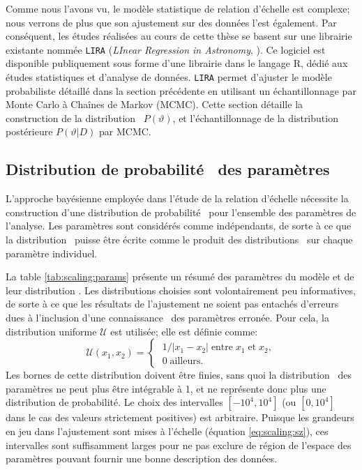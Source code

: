Comme nous l'avons vu, le modèle statistique de relation d'échelle est complexe; nous verrons de plus que son ajustement sur des données l'est également.
Par conséquent, les études réalisées au cours de cette thèse se basent sur une librairie existante nommée \texttt{LIRA} (\textit{LInear Regression in Astronomy}, \cite{sereno_bayesian_2016}).
Ce logiciel est disponible publiquement sous forme d'une librairie dans le langage R, dédié aux études statistiques et d'analyse de données.
\texttt{LIRA} permet d'ajuster le modèle probabiliste détaillé dans la section précédente en utilisant un échantillonnage par Monte Carlo à Chaînes de Markov (MCMC).
Cette section détaille la construction de la distribution \prior\ $P(\vartheta)$, et l'échantillonnage de la distribution postérieure $P(\vartheta | D)$ par MCMC.

\subsection{Distribution de probabilité \prior\ des paramètres}

L'approche bayésienne employée dans l'étude de la relation d'échelle nécessite la construction d'une distribution de probabilité \prior\ pour l'ensemble des paramètres de l'analyse.
Les paramètres sont considérés comme indépendants, de sorte à ce que la distribution \prior\ puisse être écrite comme le produit des distributions \prior\ sur chaque paramètre individuel.

La table \ref{tab:scaling:params} présente un résumé des paramètres du modèle et de leur distribution \prior.
Les distributions choisies sont volontairement peu informatives, de sorte à ce que les résultats de l'ajustement ne soient pas entachés d'erreurs dues à l'inclusion d'une connaissance \prior\ des paramètres erronée.
Pour cela, la distribution uniforme $\mathcal{U}$ est utilisée; elle est définie comme:
\begin{equation}
    \mathcal{U}(x_1, x_2) =
        \begin{cases}
            \; 1/|x_1 - x_2| \;\text{entre}\; x_1 \;\text{et}\; x_2, \\
            \; 0 \;\text{ailleurs.}
        \end{cases}
\end{equation}
Les bornes de cette distribution doivent être finies, sans quoi la distribution \prior\ des paramètres ne peut plus être intégrable à 1, et ne représente donc plus une distribution de probabilité.
Le choix des intervalles $[-10^4, 10^4]$ (ou $[0, 10^4]$ dans le cas des valeurs strictement positives) est arbitraire.
Puisque les grandeurs en jeu dans l'ajustement sont mises à l'échelle (équation \ref{eq:scaling:sz}), ces intervalles sont suffisamment larges pour ne pas exclure de région de l'espace des paramètres pouvant fournir une bonne description des données.

